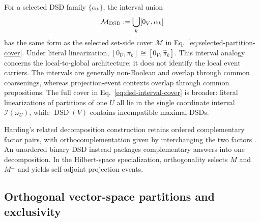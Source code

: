 \documentclass[aps,pra,reprint,nofootinbib]{revtex4-2}
\newcommand{\DSD}{\operatorname{DSD}}
\begin{document}
For a selected DSD family $\{\alpha_k\}$, the interval union
\begin{equation}
  \mathcal M_{\rm DSD}:=\bigcup_k[0_V,\alpha_k]
  \label{eq:selected-dsd-cover}
\end{equation}
has the same form as the selected set-side cover $\mathcal M$ in
Eq.~\eqref{eq:selected-partition-cover}.  Under literal linearization,
$[0_U,\pi_k]\cong[0_V,\widehat\pi_k]$.  This interval analogy concerns the
local-to-global architecture; it does not identify the local event carriers.
The intervals are generally non-Boolean and overlap through common
coarsenings, whereas projection-event contexts overlap through common
propositions.  The full cover in Eq.~\eqref{eq:dsd-interval-cover} is broader:
literal linearizations of partitions of one $U$ all lie in the single
coordinate interval $\mathcal I(\omega_U)$, while $\DSD(V)$ contains
incompatible maximal DSDs.

Harding's related decomposition construction retains ordered complementary
factor pairs, with orthocomplementation given by interchanging the two factors
\cite{harding-96}.  An unordered binary DSD instead packages complementary
answers into one decomposition.  In the Hilbert-space specialization,
orthogonality selects $M$ and $M^\perp$ and yields self-adjoint projection
events.

\subsection{Orthogonal vector-space partitions and exclusivity}
\end{document}
